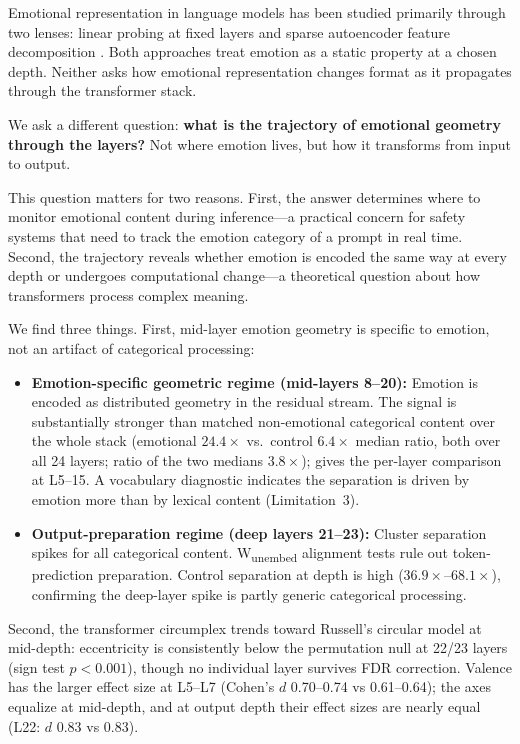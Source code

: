 \documentclass[11pt,a4paper]{article}
\begin{document}
Emotional representation in language models has been studied primarily
through two lenses: linear probing at fixed layers
\citep{alain2017understanding,belinkov2022probing} and sparse autoencoder
feature decomposition
\citep{bricken2023monosemanticity,cunningham2023sparse}. Both approaches
treat emotion as a static property at a chosen depth. Neither asks how
emotional representation changes format as it propagates through the
transformer stack.

We ask a different question: \textbf{what is the trajectory of emotional
geometry through the layers?} Not where emotion lives, but how it
transforms from input to output.

This question matters for two reasons. First, the answer determines
where to monitor emotional content during inference---a practical concern
for safety systems that need to track the emotion category of a prompt
in real time. Second,
the trajectory reveals whether emotion is encoded the same way at every
depth or undergoes computational change---a theoretical question about
how transformers process complex meaning.

We find three things. First, mid-layer emotion geometry is specific to
emotion, not an artifact of categorical processing:

\begin{itemize}[nosep]
    \item \textbf{Emotion-specific geometric regime (mid-layers 8--20):}
          Emotion is encoded as distributed geometry in the residual
          stream. The signal is substantially stronger than matched
          non-emotional categorical content over the whole stack (emotional
          $24.4\times$ vs.\ control $6.4\times$ median ratio, both over all 24 layers;
          ratio of the two medians $3.8\times$);  gives the
          per-layer comparison at L5--15. A vocabulary diagnostic
          indicates the separation is driven by emotion more than by
          lexical content (Limitation~3).
    \item \textbf{Output-preparation regime (deep layers 21--23):}
          Cluster separation spikes for all categorical content.
          W\textsubscript{unembed} alignment tests rule out
          token-prediction preparation. Control separation at depth
          is high ($36.9\times$--$68.1\times$), confirming the deep-layer
          spike is partly generic categorical processing.
\end{itemize}

Second, the transformer circumplex trends toward
Russell's circular model at mid-depth: eccentricity is consistently
below the permutation null at 22/23 layers (sign test $p < 0.001$),
though no individual layer survives FDR correction. Valence has the
larger effect size at L5--L7 (Cohen's $d$
0.70--0.74 vs 0.61--0.64); the axes equalize at mid-depth, and at output
depth their effect sizes are nearly equal (L22: $d$ 0.83 vs 0.83).
\end{document}
